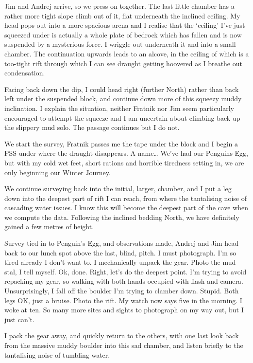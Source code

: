 Jim and Andrej arrive, so we press on together. The last little chamber
has a rather more tight slope climb out of it, flat underneath the
inclined ceiling. My head pops out into a more spacious arena and I
realise that the `ceiling' I've just squeezed under is actually a whole
plate of bedrock which has fallen and is now suspended by a mysterious
force. I wriggle out underneath it and into a small chamber. The
continuation upwards leads to an alcove, in the ceiling of which is a
too-tight rift through which I can see draught getting hoovered as I
breathe out condensation.

Facing back down the dip, I could head right (further North) rather than
back left under the suspended block, and continue down more of this
squeezy muddy inclination. I explain the situation, neither Fratnik nor
Jim seem particularly encouraged to attempt the squeeze and I am
uncertain about climbing back up the slippery mud solo. The passage
continues but I do not.

We start the survey, Fratnik passes me the tape under the block and I
begin a PSS under where the draught disappears. A name\ldots{} We've had
our Penguins Egg, but with my cold wet feet, short rations and horrible
tiredness setting in, we are only beginning our Winter Journey.

We continue surveying back into the initial, larger, chamber, and I put
a leg down into the deepest part of rift I can reach, from where the
tantalising noise of cascading water issues. I know this will become the
deepest part of the cave when we compute the data. Following the
inclined bedding North, we have definitely gained a few metres of
height.

Survey tied in to Penguin's Egg, and observations made, Andrej and Jim
head back to our lunch spot above the last, blind, pitch. I must
photograph. I'm so tired already I don't want to. I mechanically unpack
the gear. Photo the mud stal, I tell myself. Ok, done. Right, let's do
the deepest point. I'm trying to avoid repacking my gear, so walking
with both hands occupied with flash and camera. Unsurprisingly, I fall
off the boulder I'm trying to clamber down. Stupid. Both legs OK, just a
bruise. Photo the rift. My watch now says five in the morning. I woke at
ten. So many more sites and sights to photograph on my way out, but I
just can't.

I pack the gear away, and quickly return to the others, with one last
look back from the massive muddy boulder into this sad chamber, and
listen briefly to the tantalising noise of tumbling water.

